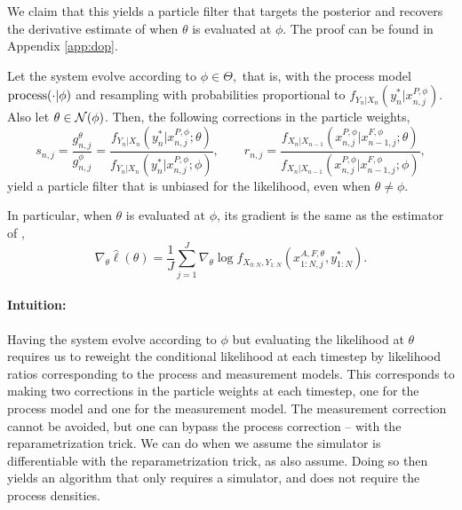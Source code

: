 \documentclass{article}
\begin{document}
We claim that this yields a particle filter that targets the posterior and recovers the derivative estimate of \citet{doucet2011sf, scibior2021dpf} when $\theta$ is evaluated at $\phi$. The proof can be found in Appendix \ref{app:dop}. 


\begin{prop}
    \label{prop:dop-correctness}

    Let the system evolve according to $\phi \in \Theta,$ that is, with the process model $\text{process}(\cdot | \phi)$ and resampling with probabilities proportional to $f_{Y_n|X_n}(y_n^* | x_{n,j}^{P,\phi})$. Also let $\theta \in {\mathcal{N}}(\phi)$. Then, the following corrections in the particle weights,
    \begin{equation}
    s_{n,j}=\frac{g_{n,j}^\theta}{g_{n,j}^{\phi}}=\frac{f_{Y_n|X_n}(y_n^*|x_{n,j}^{P, \phi}; \theta)}{f_{Y_n|X_n}(y_n^*|x_{n,j}^{P,\phi}; \phi)}, \qquad r_{n,j}=\frac{f_{X_n|X_{n-1}}(x_{n,j}^{P, \phi}|x_{n-1,j}^{F, \phi}; \theta)}{f_{X_n|X_{n-1}}(x_{n,j}^{P, \phi}|x_{n-1,j}^{F, \phi}; \phi)},
    \end{equation}
    yield a particle filter that is unbiased for the likelihood, even when $\theta \neq \phi$. 
    
    In particular, when $\theta$ is evaluated at $\phi$, its gradient is the same as the estimator of \citet{doucet2011sf},
    \begin{equation}
        \nabla_\theta \hat\ell(\theta) = \frac{1}{J}\sum_{j=1}^J \nabla_\theta \log f_{X_{0:N}, Y_{1:N}}(x_{1:N,j}^{A, F,\theta}, y_{1:N}^*).
    \end{equation}
\end{prop}


\paragraph{Intuition:} Having the system evolve according to $\phi$ but evaluating the likelihood at $\theta$ requires us to reweight the conditional likelihood at each timestep by likelihood ratios corresponding to the process and measurement models. This corresponds to making two corrections in the particle weights at each timestep, one for the process model and one for the measurement model. The measurement correction cannot be avoided, but one can bypass the process correction -- with the reparametrization trick. We can do when we assume the simulator is differentiable with the reparametrization trick, as \cite{corenflos21} also assume. Doing so then yields an algorithm that only requires a simulator, and does not require the process densities. 
\end{document}
